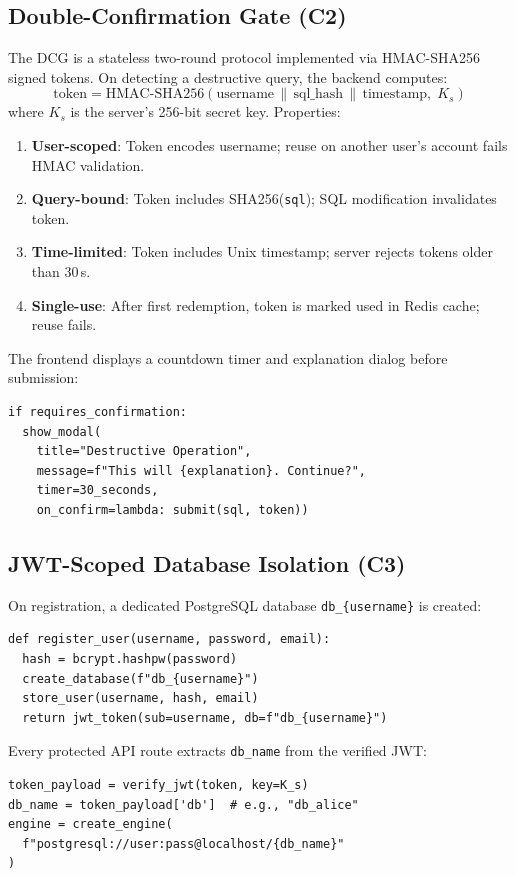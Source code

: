 \documentclass[conference]{IEEEtran}
\begin{document}
\subsection{Double-Confirmation Gate (C2)}
The DCG is a stateless two-round protocol implemented via HMAC-SHA256 signed tokens. On detecting a destructive query, the backend computes:
\begin{equation}
\text{token} = \text{HMAC-SHA256}(
  \text{username} \,\|\, \text{sql\_hash} \,\|\, \text{timestamp},\; K_s)
\end{equation}
where $K_s$ is the server's 256-bit secret key. Properties:
\begin{enumerate}
  \item \textbf{User-scoped}: Token encodes username; reuse on another user's account fails HMAC validation.
  \item \textbf{Query-bound}: Token includes SHA256(\texttt{sql}); SQL modification invalidates token.
  \item \textbf{Time-limited}: Token includes Unix timestamp; server rejects tokens older than 30\,s.
  \item \textbf{Single-use}: After first redemption, token is marked used in Redis cache; reuse fails.
\end{enumerate}

The frontend displays a countdown timer and explanation dialog before submission:
\begin{lstlisting}
if requires_confirmation:
  show_modal(
    title="Destructive Operation",
    message=f"This will {explanation}. Continue?",
    timer=30_seconds,
    on_confirm=lambda: submit(sql, token))
\end{lstlisting}

\subsection{JWT-Scoped Database Isolation (C3)}
On registration, a dedicated PostgreSQL database \texttt{db\_\{username\}} is created:
\begin{lstlisting}
def register_user(username, password, email):
  hash = bcrypt.hashpw(password)
  create_database(f"db_{username}")
  store_user(username, hash, email)
  return jwt_token(sub=username, db=f"db_{username}")
\end{lstlisting}

Every protected API route extracts \texttt{db\_name} from the verified JWT:
\begin{lstlisting}
token_payload = verify_jwt(token, key=K_s)
db_name = token_payload['db']  # e.g., "db_alice"
engine = create_engine(
  f"postgresql://user:pass@localhost/{db_name}"
)
\end{lstlisting}
\end{document}
